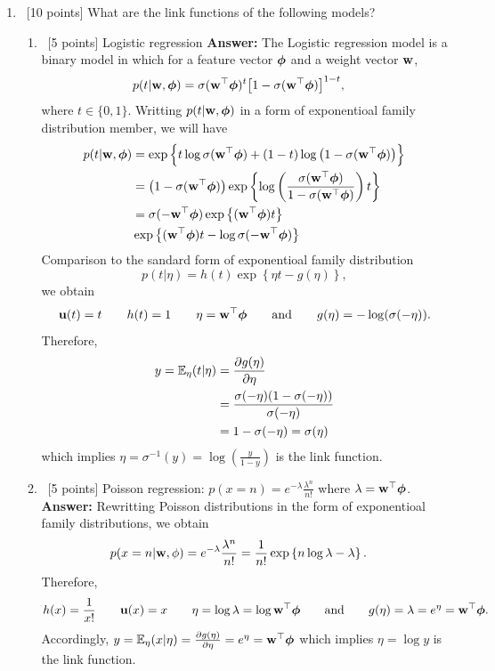 \documentclass[12pt, fullpage,letterpaper]{article}
\def\red{\color{red}}
\def\blackblue{\color{black!40!blue}}
\begin{document}
\begin{enumerate}
\item~[10 points] What are the link functions of the following models?
\begin{enumerate}
	\item~[5 points] Logistic regression
	{\bf \red Answer:} {\blackblue The Logistic regression model is a binary model in which for a feature vector $\boldsymbol{\phi}$ and a weight vector ${\bf w}$,
	\begin{align*}
	p(t|{\bf w}, \boldsymbol{\phi}) & = \sigma({\bf w}^\top\boldsymbol{\phi})^t\big[1-\sigma({\bf w}^\top\boldsymbol{\phi})\big]^{1-t},
	\end{align*}
	where $t\in\{0,1\}$. Writting $p(t|{\bf w}, \boldsymbol{\phi})$ in a form of exponentioal family distribution member, we will have 
	\begin{align*}
	p(t|{\bf w}, \boldsymbol{\phi})  & = \exp\Big\{t\log \sigma({\bf w}^\top\boldsymbol{\phi}) + (1-t)\log\big(1-\sigma({\bf w}^\top\boldsymbol{\phi})\big)\Big\}\\
	& = \left(1-\sigma({\bf w}^\top\boldsymbol{\phi})\right)\exp\left\{\log\left(\frac{\sigma({\bf w}^\top\boldsymbol{\phi})}{1-\sigma({\bf w}^\top\boldsymbol{\phi})} \right)t \right\}\\
	& = \sigma(-{\bf w}^\top\boldsymbol{\phi})\exp\left\{({\bf w}^\top\boldsymbol{\phi})t \right\}\\
	& \exp\left\{({\bf w}^\top\boldsymbol{\phi})t -\log \sigma(-{\bf w}^\top\boldsymbol{\phi}) \right\}
	\end{align*}
	Comparison to the sandard form of exponentioal family distribution
	$$p(t|\eta) = h(t)\exp\left\{\eta t - g(\eta)\right\},$$
	we obtain 
	$${\bf u}(t) = t\quad \quad h(t) =1 \quad\quad \eta =  {\bf w}^\top\boldsymbol{\phi} \quad\quad \mbox{and} \quad\quad g(\eta) =-\log(\sigma(-\eta)).$$
	Therefore, 
	\begin{align*}
	y = \mathbb{E}_\eta(t|\eta) & = \frac{\partial g(\eta)}{\partial \eta}\\
	& = \frac{\sigma(-\eta)(1-\sigma(-\eta))}{\sigma(-\eta)}\\
	& = 1-\sigma(-\eta) = \sigma(\eta)
	\end{align*}
	which implies $\eta = \sigma^{-1}(y) = \log(\frac{y}{1-y})$ is the link function. 
	}
	\item~[5 points] Poisson regression: $p(x=n) = e^{-\lambda}\frac{\lambda^n}{n!}$ where $\lambda = {\bf w}^\top \boldsymbol{\phi}$. 
	{\bf \red Answer:} {\blackblue 
	Rewritting Poisson distributions in the form of exponentioal family distributions, we obtain
	\begin{align*}
	p(x=n|{\bf w},\phi) & = e^{-\lambda}\frac{\lambda^n}{n!} = \frac{1}{n!}\exp\left\{ n\log\lambda-\lambda\right\}.
	\end{align*}
	Therefore, 
	$$h(x) = \frac{1}{x!} \quad\quad {\bf u}(x) =x \quad\quad \eta = \log \lambda=\log {\bf w}^\top\boldsymbol{\phi}\quad\quad \mbox{and}\quad\quad g(\eta) = \lambda = e^\eta = {\bf w}^\top\boldsymbol{\phi}.$$
	Accordingly, 
	$y = \mathbb{E}_\eta(x|\eta) = \frac{\partial g(\eta)}{\partial \eta} = e^\eta = {\bf w}^\top\boldsymbol{\phi}$
	which implies $\eta = \log y$ is the link function. 
	}
\end{enumerate}


\end{enumerate}
\end{document}
